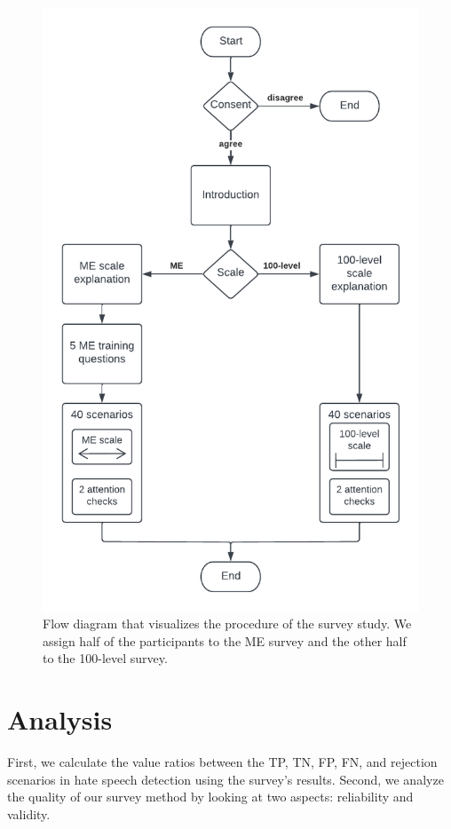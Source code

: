 \begin{figure}
    \centering
    \includegraphics[scale=.75]{Figures/survey.pdf}
    \caption{Flow diagram that visualizes the procedure of the survey study. We assign half of the participants to the ME survey and the other half to the 100-level survey.}
    \label{fig:survey-procedure}
\end{figure}

\section{Analysis}
\label{sec:survey-analysis}
First, we calculate the value ratios between the TP, TN, FP, FN, and rejection scenarios in hate speech detection using the survey's results.
%
Second, we analyze the quality of our survey method by looking at two aspects: reliability and validity.

